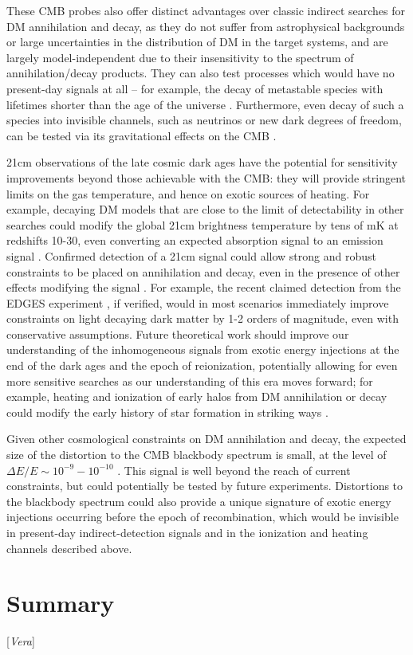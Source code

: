 \documentclass[12pt]{article}
\newcommand{\Contributors}[1]{ {\footnotesize [\textit{#1}]}}
\begin{document}
These CMB probes also offer distinct advantages over classic indirect searches for DM annihilation and decay, as they do not suffer from astrophysical backgrounds or large uncertainties in the distribution of DM in the target systems, and are largely model-independent due to their insensitivity to the spectrum of annihilation/decay products. They can also test processes which would have no present-day signals at all -- for example, the decay of metastable species with lifetimes shorter than the age of the universe \cite{Poulin:2016anj}. Furthermore, even decay of such a species into invisible channels, such as neutrinos or new dark degrees of freedom, can be tested via its gravitational effects on the CMB \cite{Poulin:2016nat}. 

21cm observations of the late cosmic dark ages have the potential for sensitivity improvements beyond those achievable with the CMB: they will provide stringent limits on the gas temperature, and hence on exotic sources of heating. For example, decaying DM models that are close to the limit of detectability in other searches could modify the global 21cm brightness temperature by tens of mK at redshifts 10-30, even converting an expected absorption signal to an emission signal \cite{Poulin:2016anj}. Confirmed detection of a 21cm signal could allow strong and robust constraints to be placed on annihilation and decay, even in the presence of other effects modifying the signal \cite{Liu:2018uzy}. For example, the recent claimed detection from the EDGES experiment \cite{Bowman:2018yin}, if verified, would in most scenarios immediately improve constraints on light decaying dark matter by 1-2 orders of magnitude, even with conservative assumptions. Future theoretical work should improve our understanding of the inhomogeneous signals from exotic energy injections at the end of the dark ages and the epoch of reionization, potentially allowing for even more sensitive searches as our understanding of this era moves forward; for example, heating and ionization of early halos from DM annihilation or decay could modify the early history of star formation in striking ways \cite{Schon:2014xoa}.

Given other cosmological constraints on DM annihilation and decay, the expected size of the distortion to the CMB blackbody spectrum is small, at the level of $\Delta E/E \sim 10^{-9}-10^{-10}$ \cite{Chluba:2016bvg}. This signal is well beyond the reach of current constraints, but could potentially be tested by future experiments. Distortions to the blackbody spectrum could also provide a unique signature of exotic energy injections occurring before the epoch of recombination, which would be invisible in present-day indirect-detection signals and in the ionization and heating channels described above.

\section{Summary}
\Contributors{Vera}



\end{document}
